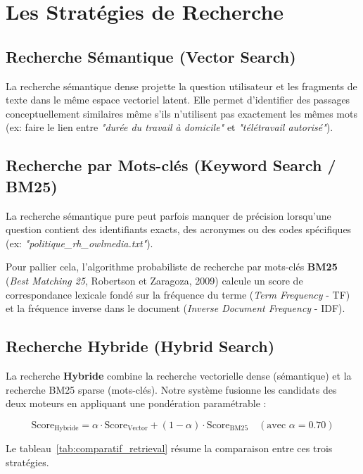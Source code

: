 \section{Les Stratégies de Recherche}

\subsection{Recherche Sémantique (Vector Search)}
La recherche sémantique dense projette la question utilisateur et les fragments de texte dans le même espace vectoriel latent. Elle permet d'identifier des passages conceptuellement similaires même s'ils n'utilisent pas exactement les mêmes mots (ex: faire le lien entre \textit{"durée du travail à domicile"} et \textit{"télétravail autorisé"}).

\subsection{Recherche par Mots-clés (Keyword Search / BM25)}
La recherche sémantique pure peut parfois manquer de précision lorsqu'une question contient des identifiants exacts, des acronymes ou des codes spécifiques (ex: \textit{"politique\_rh\_owlmedia.txt"}). 

Pour pallier cela, l'algorithme probabiliste de recherche par mots-clés \textbf{BM25} (\textit{Best Matching 25}, Robertson et Zaragoza, 2009) calcule un score de correspondance lexicale fondé sur la fréquence du terme (\textit{Term Frequency} - TF) et la fréquence inverse dans le document (\textit{Inverse Document Frequency} - IDF).

\subsection{Recherche Hybride (Hybrid Search)}
La recherche \textbf{Hybride} combine la recherche vectorielle dense (sémantique) et la recherche BM25 sparse (mots-clés). Notre système fusionne les candidats des deux moteurs en appliquant une pondération paramétrable :

\begin{equation}
\text{Score}_{\text{Hybride}} = \alpha \cdot \text{Score}_{\text{Vector}} + (1 - \alpha) \cdot \text{Score}_{\text{BM25}} \quad (\text{avec } \alpha = 0.70)
\end{equation}

Le tableau~\ref{tab:comparatif_retrieval} résume la comparaison entre ces trois stratégies.

